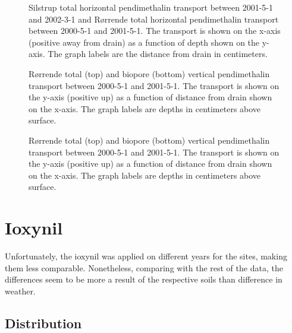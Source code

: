\begin{figure}[htbp]
  \centering

    
  \caption{Silstrup total horizontal pendimethalin transport between 2001-5-1
    and 2002-3-1 and R{\o}rrende total horizontal pendimethalin transport between
    2000-5-1 and 2001-5-1. The transport is shown on the x-axis (positive
    away from drain) as a function of depth shown on the y-axis.  The
    graph labels are the distance from drain in centimeters.}
  \label{fig:Pendimethalin-horizontal}
\end{figure}

\begin{figure}[htbp]
  \centering
  
  \caption{R{\o}rrende total (top) and biopore (bottom) vertical pendimethalin
    transport between 2000-5-1 and 2001-5-1.  The transport is shown on the
    y-axis (positive up) as a function of distance from drain shown on
    the x-axis.  The graph labels are depths in centimeters above
    surface.}
  \label{fig:Rorrende-Pendimethalin-2000}
\end{figure}

\begin{figure}[htbp]
  \centering
  
  \caption{R{\o}rrende total (top) and biopore (bottom) vertical pendimethalin
    transport between 2000-5-1 and 2001-5-1.  The transport is shown on the
    y-axis (positive up) as a function of distance from drain shown on
    the x-axis.  The graph labels are depths in centimeters above
    surface.}
  \label{fig:Rorrende-Pendimethalin-2000}
\end{figure}

\FloatBarrier
\section{Ioxynil}

Unfortunately, the ioxynil was applied on different years for the
sites, making them less comparable.  Nonetheless, comparing with the
rest of the data, the differences seem to be more a result of the
respective soils than difference in weather.

\subsection{Distribution}

